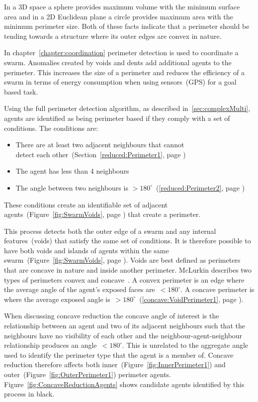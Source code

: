 In a 3D space a sphere provides maximum volume with the minimum surface area and in a 2D Euclidean plane a circle provides maximum area with the minimum perimeter size. Both of these facts indicate that a perimeter should be tending towards a structure where its outer edges are convex in nature. 

In chapter~\ref{chapter:coordination} perimeter detection is used to coordinate a swarm. Anomalies created by voids and dents add additional agents to the perimeter. This increases the size of a perimeter and reduces the efficiency of a swarm in terms of energy consumption when using sensors~(GPS) for a goal based task. 
 
Using the full perimeter detection algorithm, as described in~\autoref{sec:complexMulti}, agents are identified as being perimeter based if they comply with a set of conditions. The conditions are: 
\begin{itemize}
  \item There are at least two adjacent neighbours that cannot\\detect each other~(Section~\ref{reduced:Perimeter1}, page \pageref{reduced:Perimeter1})
  \item The agent has less than 4 neighbours
  \item The angle between two neighbours is $> 180^\circ$~(\autoref{reduced:Perimeter2}, page \pageref{reduced:Perimeter2})
\end{itemize} 
These conditions create an identifiable set of adjacent agents~(Figure~\ref{fig:SwarmVoids}, page \pageref{fig:SwarmVoids}) that create a perimeter.

This process detects both the outer edge of a swarm and any internal features~(voids) that satisfy the same set of conditions. It is therefore possible to have both voids and islands of agents within the same swarm~(Figure~\ref{fig:SwarmVoids}, page \pageref{fig:SwarmVoids}). Voids are best defined as perimeters that are concave in nature and inside another perimeter. McLurkin describes two types of perimeters convex and concave~\cite{MD:09}. A convex perimeter is an edge where the average angle of the agent's exposed faces are~$< 180^\circ$. A concave perimeter is where the average exposed angle is~$> 180^\circ$~(\autoref{concave:VoidPerimeter1}, page \pageref{concave:VoidPerimeter1}).
 
When discussing concave reduction the concave angle of interest is the relationship between an agent and two of its adjacent neighbours such that the neighbours have no visibility of each other and the neighbour-agent-neighbour relationship produces an angle~$< 180^\circ$. This is unrelated to the aggregate angle used to identify the perimeter type that the agent is a member of. Concave reduction therefore affects both inner~(Figure~\ref{fig:InnerPerimeter1}) and outer~(Figure~\ref{fig:OuterPerimeter1}) perimeter agents. Figure~\ref{fig:ConcaveReductionAgents} shows candidate agents identified by this process in black. 

